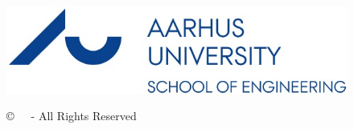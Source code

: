 \begin{titlepage}
	\begin{figure}[b]
		\centering
		\href{http://ase.au.dk/}{\includegraphics[scale=0.5]{Images/logo.jpg}}\\[0.5cm]
		\large \date\\[0.5cm]
		\copyright \sffamily  \ \ \the\year \ - All Rights Reserved
	\end{figure}
	
	
	
\end{titlepage}
